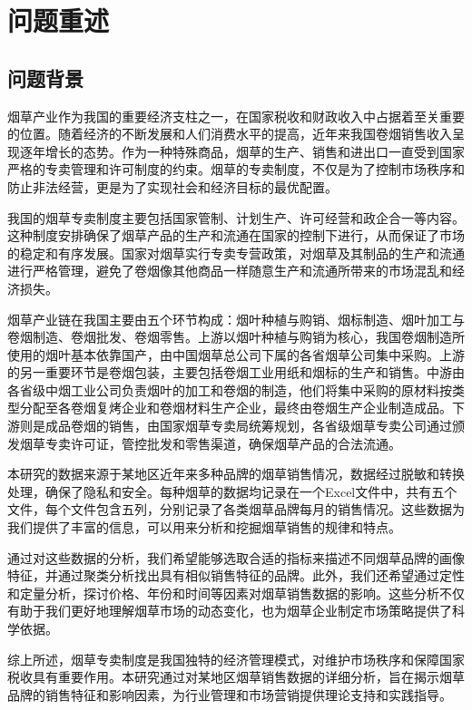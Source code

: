 \documentclass[a4paper]{article}
\begin{document}
\tableofcontents
\newpage

\pagestyle{mainmatter}
\setcounter{page}{1}
\section{问题重述}
\subsection{问题背景}

烟草产业作为我国的重要经济支柱之一，在国家税收和财政收入中占据着至关重要的位置。随着经济的不断发展和人们消费水平的提高，近年来我国卷烟销售收入呈现逐年增长的态势。作为一种特殊商品，烟草的生产、销售和进出口一直受到国家严格的专卖管理和许可制度的约束。烟草的专卖制度，不仅是为了控制市场秩序和防止非法经营，更是为了实现社会和经济目标的最优配置。

我国的烟草专卖制度主要包括国家管制、计划生产、许可经营和政企合一等内容。这种制度安排确保了烟草产品的生产和流通在国家的控制下进行，从而保证了市场的稳定和有序发展。国家对烟草实行专卖专营政策，对烟草及其制品的生产和流通进行严格管理，避免了卷烟像其他商品一样随意生产和流通所带来的市场混乱和经济损失。

烟草产业链在我国主要由五个环节构成：烟叶种植与购销、烟标制造、烟叶加工与卷烟制造、卷烟批发、卷烟零售。上游以烟叶种植与购销为核心，我国卷烟制造所使用的烟叶基本依靠国产，由中国烟草总公司下属的各省烟草公司集中采购。上游的另一重要环节是卷烟包装，主要包括卷烟工业用纸和烟标的生产和销售。中游由各省级中烟工业公司负责烟叶的加工和卷烟的制造，他们将集中采购的原材料按类型分配至各卷烟复烤企业和卷烟材料生产企业，最终由卷烟生产企业制造成品。下游则是成品卷烟的销售，由国家烟草专卖局统筹规划，各省级烟草专卖公司通过颁发烟草专卖许可证，管控批发和零售渠道，确保烟草产品的合法流通。

本研究的数据来源于某地区近年来多种品牌的烟草销售情况，数据经过脱敏和转换处理，确保了隐私和安全。每种烟草的数据均记录在一个Excel文件中，共有五个文件，每个文件包含五列，分别记录了各类烟草品牌每月的销售情况。这些数据为我们提供了丰富的信息，可以用来分析和挖掘烟草销售的规律和特点。

通过对这些数据的分析，我们希望能够选取合适的指标来描述不同烟草品牌的画像特征，并通过聚类分析找出具有相似销售特征的品牌。此外，我们还希望通过定性和定量分析，探讨价格、年份和时间等因素对烟草销售数据的影响。这些分析不仅有助于我们更好地理解烟草市场的动态变化，也为烟草企业制定市场策略提供了科学依据。

综上所述，烟草专卖制度是我国独特的经济管理模式，对维护市场秩序和保障国家税收具有重要作用。本研究通过对某地区烟草销售数据的详细分析，旨在揭示烟草品牌的销售特征和影响因素，为行业管理和市场营销提供理论支持和实践指导。
\end{document}

